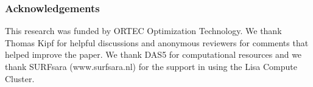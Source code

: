 \subsubsection*{Acknowledgements}
This research was funded by ORTEC Optimization Technology. We thank Thomas Kipf for helpful discussions and anonymous reviewers for comments that helped improve the paper. We thank DAS5 \citep{bal2016medium} for computational resources and we thank SURFsara (www.surfsara.nl) for the support in using the Lisa Compute Cluster.